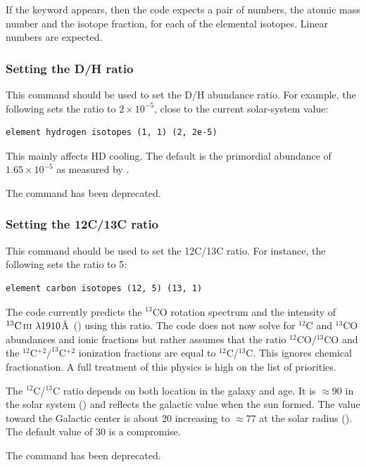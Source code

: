 If the keyword  appears, then
the code expects a pair of numbers, the atomic mass
number and the isotope fraction, for each of the
elemental isotopes.
Linear numbers are expected.

\subsubsection{Setting the D/H ratio}

This command should be used to set the D/H abundance ratio.
For example, the following sets the ratio to $2\times 10^{-5}$,
close to the current solar-system value:
%
\begin{verbatim}
element hydrogen isotopes (1, 1) (2, 2e-5)
\end{verbatim}

This mainly affects HD cooling.
The default is the primordial abundance of $1.65 \times 10^{-5}$
as measured by \citet{Pettini2001}.

The command  has been deprecated.

\subsubsection{Setting the 12C/13C ratio}

This command should be used to set the 12C/13C ratio.
For instance, the following sets the ratio to 5:
%
\begin{verbatim}
element carbon isotopes (12, 5) (13, 1)
\end{verbatim}
%

The code currently predicts the $^{13}$CO rotation spectrum
and the intensity of
$^{13}\mbox{{\ensuremath{\mathrm{C\,\scriptstyle III}}}}\ \lambda 1910$\AA\ (\citealp{Clegg1997}) using this ratio.
The code does not now solve
for $^{12}$C and $^{13}$CO abundances and ionic fractions
but rather assumes that
the ratio $^{12}$CO/$^{13}$CO and the
$^{12}$C$^{+2}/^{13}$C$^{+2}$ ionization fractions are equal to
$^{12}$C/$^{13}$C.
This ignores chemical fractionation.
A full treatment of this physics is high on the list of priorities.

The $^{12}$C/$^{13}$C ratio depends on both location in the
galaxy and age.
It is $\approx 90$ in the solar system (\citealp{Asplund2009})
and reflects the galactic value when the sun formed.
The value toward the Galactic center
is about 20 increasing to $\approx77$ at the solar radius
(\citealp{Wilson1994}).
The default value of 30 is a compromise.

The command  has been deprecated.

